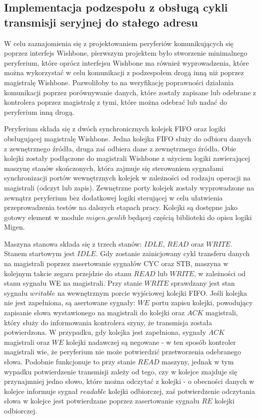 \subsection{Implementacja podzespołu z obsługą cykli transmisji seryjnej do stałego adresu}

W celu zaznajomienia się z projektowaniem peryferiów komunikujących się poprzez interfejs Wishbone, pierwszym projektem było stworzenie minimalnego peryferium, które oprócz interfejsu Wishbone ma również wyprowadzenia, które można wykorzystać w celu komunikacji z podzespołem drogą inną niż poprzez magistralę Wishbone. Pozwoliłoby to na weryfikację poprawności działania komunikacji poprzez porównywanie danych, które zostały zapisane lub odebrane z kontrolera poprzez magistralę z tymi, które można odebrać lub nadać do peryferium inną drogą.


Peryferium składa się z dwóch synchronicznych kolejek FIFO oraz logiki obsługującej magistralę Wishbone. Jedna kolejka FIFO służy do odbioru danych z zewnętrznego źródła, druga zaś odbiera dane z zewnętrznego źródła. Obie kolejki zostały podłączone do magistrali Wishbone z użyciem logiki zawierającej maszynę stanów skończonych, która zajmuje się sterowaniem sygnałami synchronizacji portów wewnętrznych kolejek w zależności od rodzaju operacji na magistrali (odczyt lub zapis). Zewnętrzne porty kolejek zostały wyprowadzone na zewnątrz peryferium bez dodatkowej logiki sterującej w celu ułatwienia przeprowadzenia testów na dalszych etapach pracy. Kolejki są dostępne jako gotowy element w module $migen.genlib$ będącej częścią biblioteki do opisu logiki Migen.


Maszyna stanowa składa się z trzech stanów: $IDLE$, $READ$ oraz $WRITE$.
Stanem startowym jest $IDLE$. Gdy zostanie zainicjowany cykl transferu danych na magistrali poprzez zasertowanie sygnałów CYC oraz STB, maszyna w kolejnym takcie zegara przejdzie do stanu $READ$ lub $WRITE$, w zależności od stanu sygnału WE na magistrali.
Przy stanie $WRITE$ sprawdzany jest stan sygnału $writable$ na wewnętrznym porcie wyjściowej kolejki FIFO. Jeśli kolejka nie jest zapełniona, są asertowane sygnały: $WE$ portu zapisu kolejki, powodujący zapisanie słowa wystawionego na magistrali do kolejki oraz $ACK$ magistrali, który służy do informowania kontrolera szyny, że transmisja została potwierdzona. W przypadku, gdy kolejka jest zapełniona, sygnały $ACK$ magistrali oraz $WE$ kolejki nadawczej są negowane - w ten sposób kontroler magistrali wie, że peryferium nie może potwierdzić przetworzenia odebranego słowa.
Podobnie funkcjonuje to przy stanie $READ$ maszyny, jednak w tym wypadku potwierdzenie transmisji zależy od tego, czy w kolejce znajduje się przynajmniej jedno słowo, które można odczytać z kolejki - o obecności danych w kolejce informuje sygnał $readable$ kolejki odbiorczej, zaś potwierdzenie odczytania słowa w kolejce jest potwierdzane poprzez zasertowanie sygnału $RE$ kolejki odbiorczej.

